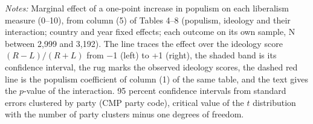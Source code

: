 \par\smallskip\begin{minipage}{\linewidth}\scriptsize\textit{Notes:} Marginal effect of a one-point increase in populism on each liberalism measure (0--10), from column (5) of Tables 4--8 (populism, ideology and their interaction; country and year fixed effects; each outcome on its own sample, N between 2,999 and 3,192). The line traces the effect over the ideology score $(R-L)/(R+L)$ from $-$1 (left) to +1 (right), the shaded band is its confidence interval, the rug marks the observed ideology scores, the dashed red line is the populism coefficient of column (1) of the same table, and the text gives the $p$-value of the interaction. 95 percent confidence intervals from standard errors clustered by party (CMP party code), critical value of the $t$ distribution with the number of party clusters minus one degrees of freedom.\end{minipage}
